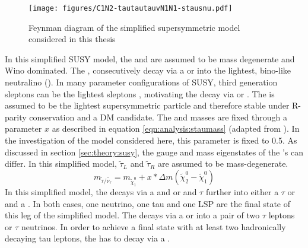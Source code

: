 \begin{figure}[!htpb]
\centering
\texttt{[image: figures/C1N2-tautautauvN1N1-stausnu.pdf]}
\caption{Feynman diagram of the simplified supersymmetric model considered in this thesis \label{fig:analysis:simplifiedmodel} \cite{AnalysisConf}}
\end{figure}
In this simplified SUSY model,  the \Ntwo and \Cone are assumed to be mass degenerate and Wino dominated.  The \Cone, \Ntwo consecutively decay via a \stau or \sneutrino into the lightest,  bino-like neutralino (\None).  In many parameter configurations of \ac{SUSY},  third generation sleptons can be the lightest sleptons \cite{SUSYPrimer},  motivating the \Cone \Ntwo decay via \stau or \sneutrino. The \None is assumed to be the lightest supersymmetric particle and therefore stable under R-parity conservation and a \ac{DM} candidate.  
The \Stau and \sneutrino masses are fixed through a parameter $x$ as described in equation \eqref{eqn:analysis:staumass}  (adapted from \cite{DiTauC1N2_2018}).  In the investigation of the model considered here,  this parameter is fixed to 0.5.  As discussed in section \ref{sec:theory:susy},  the gauge and mass eigenstates of the \stau 's can differ. In this simplified model,  $\tilde{\tau}_L$ and $\tilde{\tau}_R$ are assumed to be mass-degenerate.  
\begin{equation}
m_{\tilde{\tau}/ \tilde{\nu_\tau}} = m_{\tilde{\chi}_1^0} + x * \Delta m(\tilde{\chi}_2^0 - \tilde{\chi}_1^0)
\label{eqn:analysis:staumass} 
\end{equation}
%
In this simplified model,  the \Cone decays via a \Stau and \nutau or \sneutrino and $\tau$ further into either a $\tau$ or \nutau and a \None. In both cases,  one neutrino,  one tau and one \ac{LSP} are the final state of this leg of the simplified model.  The \Ntwo decays via a \stau or \sneutrino into a pair of two $\tau$ leptons or $\tau$ neutrinos.  In order to achieve a final state with at least two hadronically decaying tau leptons,  the \Ntwo has to decay via a \stau. 

